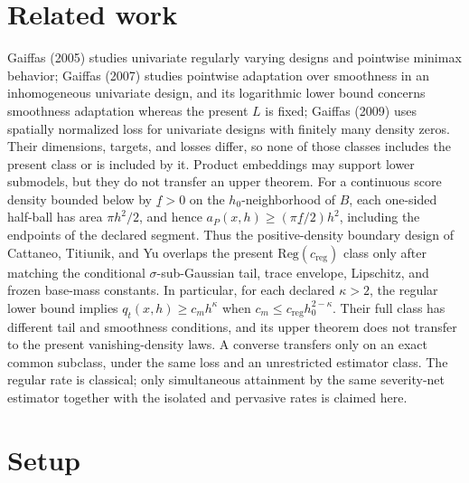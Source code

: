 \documentclass{article}
\begin{document}
\section{Related work}

Gaiffas (2005) studies univariate regularly varying designs and pointwise minimax behavior; Gaiffas (2007) studies pointwise adaptation over smoothness in an inhomogeneous univariate design, and its logarithmic lower bound concerns smoothness adaptation whereas the present \(L\) is fixed; Gaiffas (2009) uses spatially normalized loss for univariate designs with finitely many density zeros. Their dimensions, targets, and losses differ, so none of those classes includes the present class or is included by it. Product embeddings may support lower submodels, but they do not transfer an upper theorem. For a continuous score density bounded below by \(\underline f>0\) on the \(h_0\)-neighborhood of \(B\), each one-sided half-ball has area \(\pi h^2/2\), and hence \(a_P(x,h)\geq(\pi\underline f/2)h^2\), including the endpoints of the declared segment. Thus the positive-density boundary design of Cattaneo, Titiunik, and Yu overlaps the present \(\mathrm{Reg}(c_{\mathrm{reg}})\) class only after matching the conditional \(\sigma\)-sub-Gaussian tail, trace envelope, Lipschitz, and frozen base-mass constants. In particular, for each declared \(\kappa>2\), the regular lower bound implies \(q_t(x,h)\geq c_mh^\kappa\) when \(c_m\leq c_{\mathrm{reg}}h_0^{2-\kappa}\). Their full class has different tail and smoothness conditions, and its upper theorem does not transfer to the present vanishing-density laws. A converse transfers only on an exact common subclass, under the same loss and an unrestricted estimator class. The regular rate is classical; only simultaneous attainment by the same severity-net estimator together with the isolated and pervasive rates is claimed here.

\section{Setup}
\end{document}
